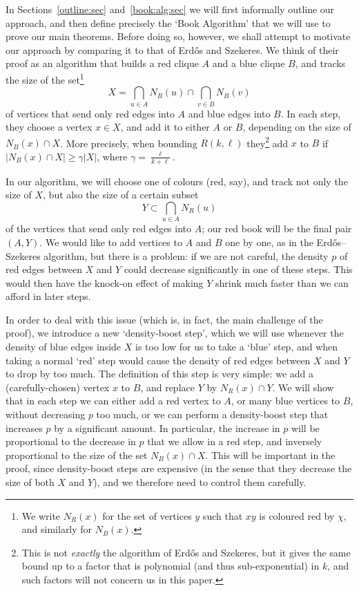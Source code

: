 \documentclass[12pt,reqno]{amsart}
\theoremstyle{definition}
\theoremstyle{remark}
\renewcommand{\ge}{\geqslant}
\begin{document}
In Sections~\ref{outline:sec} and~\ref{book:alg:sec} we will first informally outline our approach, and then define precisely the `Book Algorithm' that we will use to prove our main theorems. Before doing so, however, we shall attempt to motivate our approach by comparing it to that of Erd\H{o}s and Szekeres. We think of their proof as an algorithm that builds a red clique $A$ and a blue clique $B$, and tracks the size of the set\footnote{We write $N_R(x)$ for the set of vertices $y$ such that $xy$ is coloured red by $\chi$, and similarly for $N_B(x)$.} 
$$X = \bigcap_{u \in A} N_R(u) \cap \bigcap_{v \in B} N_B(v)$$
of vertices that send only red edges into $A$ and blue edges into $B$. In each step, they choose a vertex $x \in X$, and add it to either $A$ or $B$, depending on the size of $N_B(x) \cap X$. More precisely, when bounding $R(k,\ell)$ they\footnote{This is not \emph{exactly} the algorithm of Erd\H{o}s and Szekeres, but it gives the same bound up to a factor that is polynomial (and thus sub-exponential) in $k$, and such factors will not concern us in this paper.} add $x$ to $B$ if $|N_B(x) \cap X| \ge \gamma |X|$, where $\gamma = \frac{\ell}{k+\ell}$. 


In our algorithm, we will choose one of colours (red, say), and track not only the size of $X$, but also the size of a certain subset
$$Y \subset \bigcap_{u \in A} N_R(u)$$
of the vertices that send only red edges into $A$; our red book will be the final pair $(A,Y)$. We would like to add vertices to $A$ and $B$ one by one, as in the Erd\H{o}s--Szekeres algorithm, but there is a problem: if we are not careful, the density $p$ of red edges between $X$ and $Y$ could decrease significantly in one of these steps. This would then have the knock-on effect of making $Y$ shrink much faster than we can afford in later steps.



In order to deal with this issue (which is, in fact, the main challenge of the proof), we introduce a new `density-boost step', which we will use whenever the density of blue edges inside $X$ is too low for us to take a `blue' step, and when taking a normal `red' step would cause the density of red edges between $X$ and $Y$ to drop by too much. The definition of this step is very simple: we add a (carefully-chosen) vertex $x$ to $B$, and replace $Y$ by $N_R(x) \cap Y$. We will show that in each step we can either add a red vertex to $A$, or many blue vertices to $B$, without decreasing $p$ too much, or we can perform a density-boost step that increases $p$ by a significant amount. In particular, %
the increase in $p$ will be proportional to the decrease in $p$ that we allow in a red step, and inversely proportional to the size of the set $N_B(x) \cap X$. This will be important in the proof, since density-boost steps are expensive (in the sense that they decrease the size of both $X$ and $Y$), and we therefore need to control them carefully. 
\end{document}

